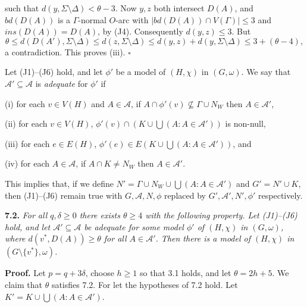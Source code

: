 \noindent such that $d(y, \Sigma \setminus \Delta) < \theta - 3$. Now $y, z$ both intersect $D(A)$, and $bd(D(A))$ is a $\Gamma$-normal $O$-arc with $|bd(D(A)) \cap V(\Gamma)| \le 3$ and $ins(D(A)) = D(A)$, by (J4). Consequently $d(y, z) \le 3$. But
\begin{equation*}
\theta \le d(D(A'), \Sigma \setminus \Delta) \le d(z, \Sigma \setminus \Delta) \le d(y, z) + d(y, \Sigma \setminus \Delta) \le 3 + (\theta - 4),
\end{equation*}
a contradiction. This proves (iii). $\square$

Let (J1)--(J6) hold, and let $\phi'$ be a model of $(H, \chi)$ in $(G, \omega)$. We say that $\mathcal{A}' \subseteq \mathcal{A}$ is \textit{adequate} for $\phi'$ if

\hspace*{12pt}(i) for each $v \in V(H)$ and $A \in \mathcal{A}$, if $A \cap \phi'(v) \not\subseteq \Gamma \cup N_W$ then $A \in \mathcal{A}'$,

\hspace*{12pt}(ii) for each $v \in V(H)$, $\phi'(v) \cap (K \cup \bigcup(A : A \in \mathcal{A}'))$ is non-null,

\hspace*{12pt}(iii) for each $e \in E(H)$, $\phi'(e) \in E(K \cup \bigcup(A : A \in \mathcal{A}'))$, and

\hspace*{12pt}(iv) for each $A \in \mathcal{A}$, if $A \cap K \ne N_W$ then $A \in \mathcal{A}'$.

This implies that, if we define $N' = \Gamma \cup N_W \cup \bigcup(A : A \in \mathcal{A}')$ and $G' = N' \cup K$, then (J1)--(J6) remain true with $G, \mathcal{A}, N, \phi$ replaced by $G', \mathcal{A}', N', \phi'$ respectively.

\textbf{7.2.} \textit{For all $q, \delta \ge 0$ there exists $\theta \ge 4$ with the following property. Let (J1)--(J6) hold, and let $\mathcal{A}' \subseteq \mathcal{A}$ be adequate for some model $\phi'$ of $(H, \chi)$ in $(G, \omega)$, where $d(v^*, D(A)) \ge \theta$ for all $A \in \mathcal{A}'$. Then there is a model of $(H, \chi)$ in $(G \setminus \{v^*\}, \omega)$.}

\textbf{Proof.} Let $p = q + 3\delta$, choose $h \ge 1$ so that 3.1 holds, and let $\theta = 2h + 5$. We claim that $\theta$ satisfies 7.2. For let the hypotheses of 7.2 hold. Let $K' = K \cup \bigcup(A : A \in \mathcal{A}')$.

